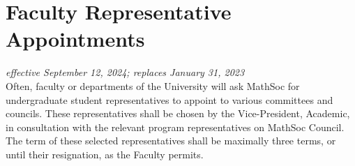 \section{Faculty Representative Appointments}
\emph{effective September 12, 2024; replaces January 31, 2023}\\

Often, faculty or departments of the University will ask MathSoc for undergraduate student representatives to appoint to various committees and councils. These representatives shall be chosen by the Vice-President, Academic, in consultation with the relevant program representatives on MathSoc Council. The term of these selected representatives shall be maximally three terms, or until their resignation, as the Faculty permits.
